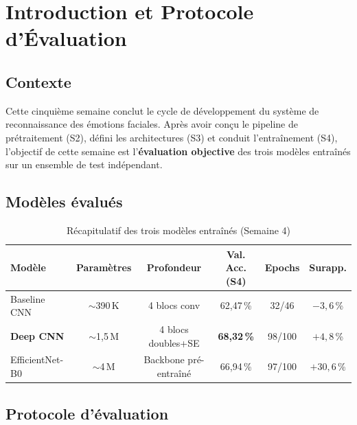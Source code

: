 \documentclass[12pt,a4paper]{article}
\begin{document}
\tableofcontents
\newpage

\section{Introduction et Protocole d'Évaluation}

\subsection{Contexte}

Cette cinquième semaine conclut le cycle de développement du système de
reconnaissance des émotions faciales. Après avoir conçu le pipeline de
prétraitement (S2), défini les architectures (S3) et conduit l'entraînement
(S4), l'objectif de cette semaine est l'\textbf{évaluation objective} des trois
modèles entraînés sur un ensemble de test indépendant.

\subsection{Modèles évalués}

\begin{table}[H]
  \centering
  \caption{Récapitulatif des trois modèles entraînés (Semaine 4)}
  \begin{tabular}{lccccc}
    \toprule
    \textbf{Modèle} & \textbf{Paramètres} & \textbf{Profondeur}
      & \textbf{Val. Acc. (S4)} & \textbf{Epochs} & \textbf{Surapp.} \\
    \midrule
    Baseline CNN     & $\sim$390\,K  & 4 blocs conv & 62,47\,\% & 32/46  & $-3,6$\,\% \\
    \textbf{Deep CNN}& $\sim$1,5\,M  & 4 blocs doubles+SE & \textbf{68,32\,\%} & 98/100 & $+4,8$\,\% \\
    EfficientNet-B0  & $\sim$4\,M    & Backbone pré-entraîné & 66,94\,\% & 97/100 & $+30,6$\,\% \\
    \bottomrule
  \end{tabular}
\end{table}

\subsection{Protocole d'évaluation}
\end{document}
